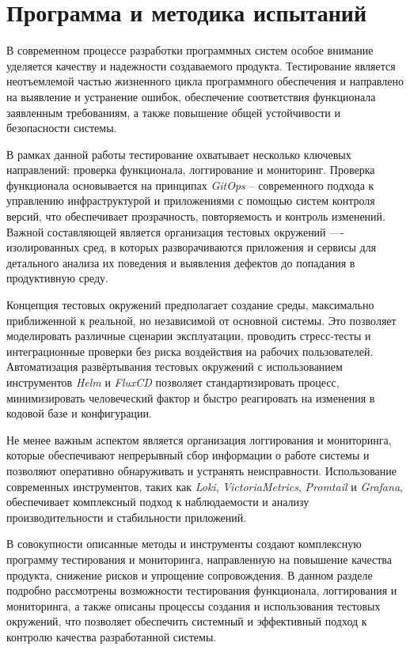 \section{Программа и методика испытаний}

В современном процессе разработки программных систем особое внимание уделяется качеству и надежности создаваемого продукта. Тестирование является неотъемлемой частью жизненного цикла программного обеспечения и направлено на выявление и устранение ошибок, обеспечение соответствия функционала заявленным требованиям, а также повышение общей устойчивости и безопасности системы. 

В рамках данной работы тестирование охватывает несколько ключевых направлений: проверка функционала, логгирование и мониторинг. Проверка функционала основывается на принципах \textit{GitOps} -- современного подхода к управлению инфраструктурой и приложениями с помощью систем контроля версий, что обеспечивает прозрачность, повторяемость и контроль изменений. Важной составляющей является организация тестовых окружений —- изолированных сред, в которых разворачиваются приложения и сервисы для детального анализа их поведения и выявления дефектов до попадания в продуктивную среду.

Концепция тестовых окружений предполагает создание среды, максимально приближенной к реальной, но независимой от основной системы. Это позволяет моделировать различные сценарии эксплуатации, проводить стресс-тесты и интеграционные проверки без риска воздействия на рабочих пользователей. Автоматизация развёртывания тестовых окружений с использованием инструментов \textit{Helm} и \textit{FluxCD} позволяет стандартизировать процесс, минимизировать человеческий фактор и быстро реагировать на изменения в кодовой базе и конфигурации.

Не менее важным аспектом является организация логгирования и мониторинга, которые обеспечивают непрерывный сбор информации о работе системы и позволяют оперативно обнаруживать и устранять неисправности. Использование современных инструментов, таких как \textit{Loki}, \textit{VictoriaMetrics}, \textit{Promtail} и \textit{Grafana}, обеспечивает комплексный подход к наблюдаемости и анализу производительности и стабильности приложений.

В совокупности описанные методы и инструменты создают комплексную программу тестирования и мониторинга, направленную на повышение качества продукта, снижение рисков и упрощение сопровождения. В данном разделе подробно рассмотрены возможности тестирования функционала, логгирования и мониторинга, а также описаны процессы создания и использования тестовых окружений, что позволяет обеспечить системный и эффективный подход к контролю качества разработанной системы.

